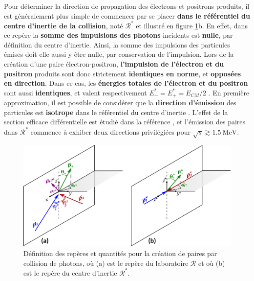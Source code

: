 \begin{refsection}
Pour déterminer la direction de propagation des électrons et positrons produits, il est généralement plus simple de commencer par se placer \textbf{dans le référentiel du centre d'inertie de la collision}, noté $\mathcal{R}^*$ et illustré en figure \ref{fig:1-repere_cinematique}b. En effet, dans ce repère la \textbf{somme des impulsions des photons} incidents est \textbf{nulle}, par définition du centre d'inertie. Ainsi, la somme des impulsions des particules émises doit elle aussi y être nulle, par conservation de l'impulsion. Lors de la création d'une paire électron-positron, \textbf{l'impulsion de l'électron et du positron} produits sont donc strictement \textbf{identiques en norme}, et \textbf{opposées en direction}. Dans ce cas, les \textbf{énergies totales de l'électron et du positron} sont aussi \textbf{identiques}, et valent respectivement $E_-^*=E_+^*=E_{CM}/2$ . En première approximation, il est possible de considérer que la \textbf{direction d'émission} des particules est \textbf{isotrope} dans le référentiel du centre d'inertie \parencite{ribeyre_2017}. L'effet de la section efficace différentielle est étudié dans la référence \parencite{ribeyre_2018}, et l'émission des paires dans $\mathcal{R}^*$ commence à exhiber deux directions privilégiées pour $\sqrt{s} \gtrsim 1.5 ~ \si{\MeV}$.

\begin{figure}[hbtp]
	\centering
	\includegraphics[width=\linewidth]{1-particules/basis_definition.png}
	\caption{Définition des repères et quantités pour la création de paires par collision de photons, où (a) est le repère du laboratoire $\mathcal{R}$ et où (b) est le repère du centre d'inertie $\mathcal{R}^*$.}
	\label{fig:1-repere_cinematique}
\end{figure}


\end{refsection}
